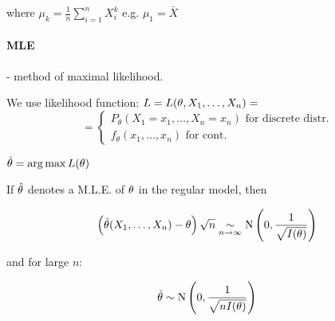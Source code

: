 where $\mu_k = \frac{1}{n} \sum_{i=1}^n X_i^k$ e.g. $\mu_1 = \bar{X}$

\paragraph{MLE}
- method of maximal likelihood.

We use likelihood function: $L = L(\theta, X_{1}, \ldots, X_{n}) = $
\[ = \begin{cases}
P_\theta(X_1 = x_1, \ldots, X_n = x_n) \mbox{ for discrete distr.} \\
f_\theta(x_1, \ldots, x_n) \mbox{ for cont.}
\end{cases} \]

$ \hat{\theta} = \arg \max L(\theta) $

If $\hat{\theta}$ denotes a M.L.E. of $\theta$ in the regular model, then

\[ \left( \hat{\theta}(X_{1}, \ldots, X_{n}) - \theta \right) \sqrt{n}
 \underset{n \rightarrow \infty}{\sim}  \textrm{N}\left( 0, \frac{1}{\sqrt{I(\theta)}} \right) \]

and for large $n$:

\[ \hat{\theta} \sim \textrm{N}\left( 0, \frac{1}{\sqrt{n I(\theta)}} \right) \]



